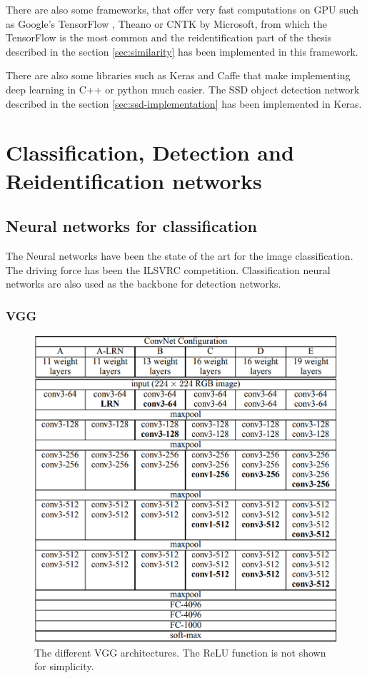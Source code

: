 \documentclass[a4paper,12pt,titlepage, twoside]{article}
\numberwithin{figure}{section}
\begin{document}
There are also some frameworks, that offer very fast computations on GPU such as Google's TensorFlow \cite{abadi2016tensorflow}, Theano \cite{bergstra2011theano} or CNTK\cite{seide2016cntk} by Microsoft, from which the TensorFlow is the most common and the reidentification part of the thesis described in the section \ref{sec:similarity} has been implemented in this framework. 

There are also some libraries such as Keras \cite{chollet2015keras} and Caffe \cite{jia2014caffe} that make implementing deep learning in C++ or python much easier. The SSD object detection network described in the section \ref{sec:ssd-implementation} has been implemented in Keras.


\clearpage
\section{Classification, Detection and Reidentification networks}
\subsection{Neural networks for classification}
\label{sec:neural_networks_classification}
The Neural networks have been the state of the art for the image classification. The driving force has been the ILSVRC \cite{krizhevsky2012imagenet} competition. Classification neural networks are also used as the backbone for detection networks.



\subsubsection{VGG}
\label{sec:vgg}

\begin{figure}[h!]
\centering
\includegraphics[width=1\linewidth]{fig/vgg.png}
\caption{The different VGG architectures. The ReLU function is not shown for simplicity. \cite{simonyan2014very}}
\label{fig:vgg}
\end{figure}
\end{document}
